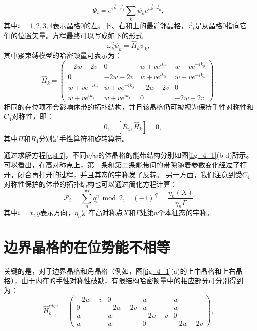 \begin{equation}\label{eq4-6}
    \Psi_i = e^{i\vec{k} \cdot \vec{r}_i} \sum_{k} \psi_k e^{i\vec{k} \cdot \vec{r}_0},
\end{equation}
其中$i = 1,2,3,4$表示晶格0的左、下、右和上的最近邻晶格，$\vec{r}_i$是从晶格0指向它们的位置矢量。方程最终可以写成如下的形式
\begin{equation}\label{eq4-7}
    \omega_k^2 \psi_k = \hat{H}_k \psi_k,
\end{equation}
其中紧束缚模型的哈密顿量可表示为：
\begin{equation}
\hat{H}_k = 
\begin{pmatrix}
-2w - 2v & 0 & w + ve^{ik_x} & w + ve^{-ik_y} \\
0 & -2w - 2v & w + ve^{ik_y} & w + ve^{-ik_x} \\
w + ve^{-ik_x} & w + ve^{-ik_y} & -2w - 2v & 0 \\
w + ve^{ik_y} & w + ve^{ik_x} & 0 & -2w - 2v
\end{pmatrix}.
\label{eq4-8}
\end{equation}
相同的在位项不会影响体带的拓扑结构，并且该晶格仍可被视为保持手性对称性和\(C_4\)对称性，即：
\begin{equation}
[\Pi, \hat{H}_k + (2w + 2v)\mathbb{I}_{4\times4}] = 0, \quad [R_4, \hat{H}_k] = 0,
\label{eq4-9}
\end{equation}
其中\(\Pi\)和\(R_4\)分别是手性算符和旋转算符。

通过求解方程\ref{eq4-7}，不同\(v/w\)的体晶格的能带结构分别如图\ref{fig_4_1}(b-d)所示。可以看出，在高对称点上，第一条和第二条能带间的带隙随着参数变化经过了打开，闭合再打开的过程，并且其态的宇称发了反转。
另一方面，我们注意到受$C_4$对称性保护的体带的拓扑结构也可以通过简化方程\cite{C45-1}计算：
\begin{equation}
    \mathcal{P}_i = \sum_{n}^{occ} q_i^n \bmod 2, \quad (-1)^{q_i^n} = \frac{\eta_n(X)}{\eta_n\Gamma}
    \label{eq4-10}
\end{equation}
其中$i = x,y$表示方向，$\eta_n$是在高对称点$X$和$\Gamma$处第$n$个本征态的宇称。

\section{边界晶格的在位势能不相等}
关键的是，对于边界晶格和角晶格（例如，图\ref{fig_4_1}(a)的上中晶格和上右晶格），由于内在的手性对称性破缺，有限结构哈密顿量中的相应部分可分别得到为：
\begin{equation}
\hat{H}_k^{edge} = 
\begin{pmatrix}
-2w - v & 0 & w & w \\
0 & -2w - 2v & w & w \\
w & w & -2w - v & 0 \\
w & w & 0 & -2w - 2v
\end{pmatrix},
\label{eq4-11}
\end{equation}

